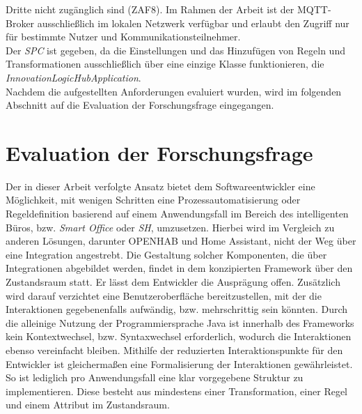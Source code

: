         Dritte nicht zugänglich sind (ZAF8). Im Rahmen der Arbeit ist der \acs{MQTT}-Broker ausschließlich im lokalen Netzwerk verfügbar und erlaubt den Zugriff nur für bestimmte Nutzer und Kommunikationsteilnehmer. 
        \\
        \linebreak
        Der \textit{\acl{SPC}} ist gegeben, da die Einstellungen und das Hinzufügen von Regeln und Transformationen ausschließlich über eine einzige Klasse funktionieren, die \textit{InnovationLogicHubApplication}. 
        \\
        \linebreak
        Nachdem die aufgestellten Anforderungen evaluiert wurden, wird im folgenden Abschnitt auf die Evaluation der Forschungsfrage eingegangen.
        \pagebreak

\section{Evaluation der Forschungsfrage}
    Der in dieser Arbeit verfolgte Ansatz bietet dem Softwareentwickler eine Möglichkeit, mit wenigen Schritten eine 
    Prozessautomatisierung oder Regeldefinition basierend auf einem Anwendungsfall im Bereich des intelligenten 
    Büros, bzw. \textit{Smart Office} oder \textit{\acl{SH}}, umzusetzen. Hierbei wird im Vergleich zu anderen 
    Lösungen, darunter \acs{OPENHAB} und Home Assistant, nicht der Weg über eine Integration angestrebt. 
    Die Gestaltung solcher Komponenten, die über Integrationen abgebildet werden, findet in dem konzipierten 
    Framework über den Zustandsraum statt. Er lässt dem Entwickler die Ausprägung offen. Zusätzlich 
    wird darauf verzichtet eine Benutzeroberfläche bereitzustellen, mit der die Interaktionen gegebenenfalls 
    aufwändig, bzw. mehrschrittig sein könnten. Durch die alleinige Nutzung der Programmiersprache Java ist innerhalb des 
    Frameworks kein Kontextwechsel, bzw. Syntaxwechsel erforderlich, wodurch die Interaktionen ebenso vereinfacht bleiben. 
    Mithilfe der reduzierten Interaktionspunkte für den Entwickler ist gleichermaßen eine Formalisierung der Interaktionen 
    gewährleistet. So ist lediglich pro Anwendungsfall eine klar vorgegebene Struktur zu implementieren. Diese besteht aus mindestens einer 
    Transformation, einer Regel und einem Attribut im Zustandsraum. 
